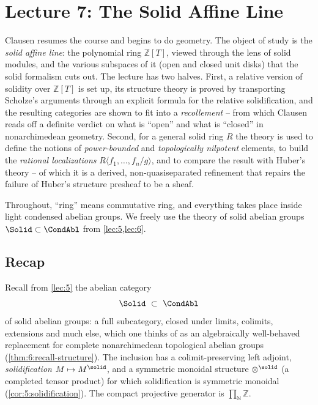 \section{Lecture 7: The Solid Affine Line}
\label{lec:7}

Clausen resumes the course and begins to do geometry. The object of study is
the \emph{solid affine line}: the polynomial ring $\mathbb{Z}[T]$, viewed
through the lens of solid modules, and the various subspaces of it (open and
closed unit disks) that the solid formalism cuts out. The lecture has two
halves. First, a relative version of solidity over $\mathbb{Z}[T]$ is set up,
its structure theory is proved by transporting Scholze's arguments through an
explicit formula for the relative solidification, and the resulting
categories are shown to fit into a \emph{recollement}
-- from which Clausen reads off a definite verdict on what is ``open'' and
what is ``closed'' in nonarchimedean geometry. Second, for a general solid
ring $R$ the theory is used to define the notions of \emph{power-bounded} and
\emph{topologically nilpotent} elements, to build the \emph{rational
localizations} $R\langle f_1,\dots,f_n/g\rangle$, and to compare the result
with Huber's theory -- of which it is a derived, non-quasiseparated
refinement that repairs the failure of Huber's structure presheaf to be a
sheaf.

Throughout, ``ring'' means commutative ring, and everything takes place inside
light condensed abelian groups. We freely use the theory of solid abelian
groups $\Solid\subset\CondAbl$ from \cref{lec:5,lec:6}.

\subsection{Recap}

Recall from \cref{lec:5} the abelian category
\begin{equation*}
\Solid\ \subset\ \CondAbl
\end{equation*}
of solid abelian groups: a full subcategory, closed under limits, colimits,
extensions and much else, which one thinks of as an algebraically well-behaved
replacement for complete nonarchimedean topological abelian groups
(\cref{thm:6:recall-structure}). The inclusion has a colimit-preserving left
adjoint, \emph{solidification} $M\mapsto M^{\solid}$, and a symmetric monoidal
structure $\otimes^{\solid}$ (a completed tensor product) for which
solidification is symmetric monoidal (\cref{cor:5:solidification}). The
compact projective generator is $\prod_{\mathbb{N}}\mathbb{Z}$.

